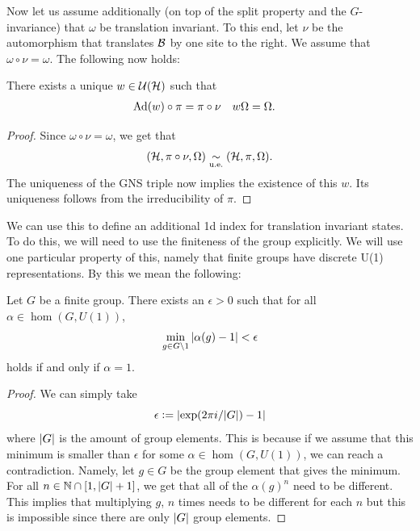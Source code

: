 \documentclass[11pt,a4paper,twoside]{article}
\numberwithin{equation}{section}
\begin{document}
	Now let us assume additionally (on top of the split property and the $G$-invariance) that $\omega$ be translation invariant. To this end, let $\nu$ be the automorphism that translates $\mathcal B$ by one site to the right. We assume that $\omega\circ\nu=\omega$. The following now holds:
	\begin{lemma}
		There exists a unique $w\in\mathcal U(\mathcal H)$ such that
		\begin{align}
			\Ad{w}\circ\pi&=\pi\circ\nu&w\Omega&=\Omega.
		\end{align}
	\end{lemma}
	\begin{proof}
		Since $\omega\circ\nu=\omega$, we get that
		\begin{equation}
			(\mathcal H,\pi\circ\nu,\Omega)\underset{\text{u.e.}}{\sim} (\mathcal H,\pi,\Omega).
		\end{equation}
		The uniqueness of the GNS triple now implies the existence of this $w$. Its uniqueness follows from the irreducibility of $\pi$.
	\end{proof}
	We can use this to define an additional 1d index for translation invariant states. To do this, we will need to use the finiteness of the group explicitly. We will use one particular property of this, namely that finite groups have discrete U(1) representations. By this we mean the following:
	\begin{lemma}\label{lem:FiniteGroupsHaveDiscreteU(1)Representations}
		Let $G$ be a finite group. There exists an $\epsilon>0$ such that for all $\alpha\in\hom(G,U(1))$,
		\begin{equation}
			\min_{g\in G\setminus 1}\abs{\alpha(g)-1}<\epsilon
		\end{equation}
		holds if and only if $\alpha=1$.
	\end{lemma}
	\begin{proof}
		We can simply take
		\begin{equation}
			\epsilon\vcentcolon= \abs{\exp(2\pi i/\abs{G})-1}
		\end{equation}
		where $\abs{G}$ is the amount of group elements. This is because if we assume that this minimum is smaller than $\epsilon$ for some $\alpha\in\hom(G,U(1))$, we can reach a contradiction. Namely, let $g\in G$ be the group element that gives the minimum. For all $n\in\mathbb{N}\cap [1,\abs{G}+1]$, we get that all of the $\alpha(g)^n$ need to be different. This implies that multiplying $g$, $n$ times needs to be different for each $n$ but this is impossible since there are only $\abs{G}$ group elements.
	\end{proof}
\end{document}

